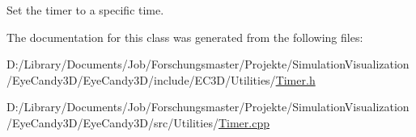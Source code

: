 Set the timer to a specific time. 

The documentation for this class was generated from the following files\+:\begin{DoxyCompactItemize}
\item 
D\+:/\+Library/\+Documents/\+Job/\+Forschungsmaster/\+Projekte/\+Simulation\+Visualization/\+Eye\+Candy3\+D/\+Eye\+Candy3\+D/include/\+E\+C3\+D/\+Utilities/\mbox{\hyperlink{_timer_8h}{Timer.\+h}}\item 
D\+:/\+Library/\+Documents/\+Job/\+Forschungsmaster/\+Projekte/\+Simulation\+Visualization/\+Eye\+Candy3\+D/\+Eye\+Candy3\+D/src/\+Utilities/\mbox{\hyperlink{_timer_8cpp}{Timer.\+cpp}}\end{DoxyCompactItemize}
